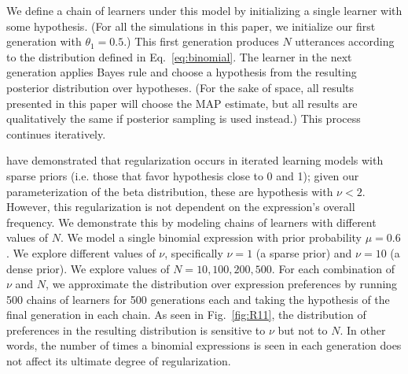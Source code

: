 \documentclass{evolang11}
\begin{document}

We define a chain of learners under this model by initializing a single learner with some hypothesis. (For all the simulations in this paper, we initialize our first generation with $\theta_1=0.5$.) This first generation produces $N$ utterances according to the distribution defined in Eq.\ \ref{eq:binomial}. The learner in the next generation applies Bayes rule and choose a hypothesis from the resulting posterior distribution over hypotheses. (For the sake of space, all results presented in this paper will choose the MAP estimate, but all results are qualitatively the same if posterior sampling is used instead.) This process continues iteratively.

 have demonstrated that regularization occurs in iterated learning models with sparse priors (i.e. those that favor hypothesis close to 0 and 1); given our parameterization of the beta distribution, these are hypothesis with $\nu<2$. However, this regularization is not dependent on the expression's overall frequency. We demonstrate this by modeling chains of learners with different values of $N$. We model a single binomial expression with prior probability $\mu=0.6$. We explore different values of $\nu$, specifically $\nu=1$ (a sparse prior) and $\nu=10$ (a dense prior). We explore values of $N=10,100,200,500$. For each combination of $\nu$ and $N$, we approximate the distribution over expression preferences by running 500 chains of learners for 500 generations each and taking the hypothesis of the final generation in each chain. As seen in Fig.\ \ref{fig:R11}, the distribution of preferences in the resulting distribution is sensitive to $\nu$ but not to $N$. In other words, the number of times a binomial expressions is seen in each generation does not affect its ultimate degree of regularization.
\end{document}
